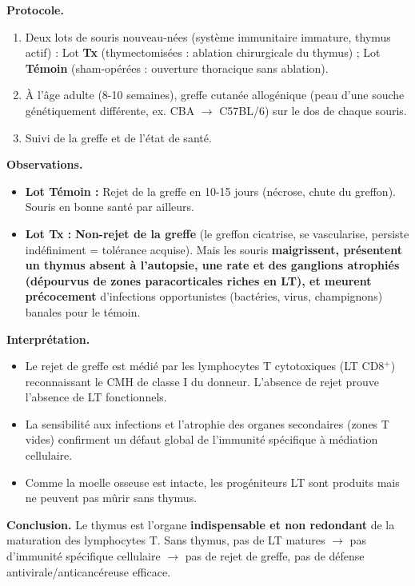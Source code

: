 \documentclass[11pt]{article}
\begin{document}
\begin{experience}
\textbf{Protocole.}
\begin{enumerate}
\item Deux lots de souris nouveau-nées (système immunitaire immature, thymus actif) : Lot \textbf{Tx} (thymectomisées : ablation chirurgicale du thymus) ; Lot \textbf{Témoin} (sham-opérées : ouverture thoracique sans ablation).
\item À l'âge adulte (8-10 semaines), greffe cutanée allogénique (peau d'une souche génétiquement différente, ex. CBA $\rightarrow$ C57BL/6) sur le dos de chaque souris.
\item Suivi de la greffe et de l'état de santé.
\end{enumerate}

\textbf{Observations.}
\begin{itemize}
\item \textbf{Lot Témoin :} Rejet de la greffe en 10-15 jours (nécrose, chute du greffon). Souris en bonne santé par ailleurs.
\item \textbf{Lot Tx :} \textbf{Non-rejet de la greffe} (le greffon cicatrise, se vascularise, persiste indéfiniment = tolérance acquise). Mais les souris \textbf{maigrissent, présentent un thymus absent à l'autopsie, une rate et des ganglions atrophiés (dépourvus de zones paracorticales riches en LT), et meurent précocement} d'infections opportunistes (bactéries, virus, champignons) banales pour le témoin.
\end{itemize}

\textbf{Interprétation.}
\begin{itemize}
\item Le rejet de greffe est médié par les lymphocytes T cytotoxiques (LT CD8$^+$) reconnaissant le CMH de classe I du donneur. L'absence de rejet prouve l'absence de LT fonctionnels.
\item La sensibilité aux infections et l'atrophie des organes secondaires (zones T vides) confirment un défaut global de l'immunité spécifique à médiation cellulaire.
\item Comme la moelle osseuse est intacte, les progéniteurs LT sont produits mais ne peuvent pas mûrir sans thymus.
\end{itemize}

\textbf{Conclusion.} Le thymus est l'organe \textbf{indispensable et non redondant} de la maturation des lymphocytes T. Sans thymus, pas de LT matures $\rightarrow$ pas d'immunité spécifique cellulaire $\rightarrow$ pas de rejet de greffe, pas de défense antivirale/anticancéreuse efficace.
\end{experience}
\end{document}
